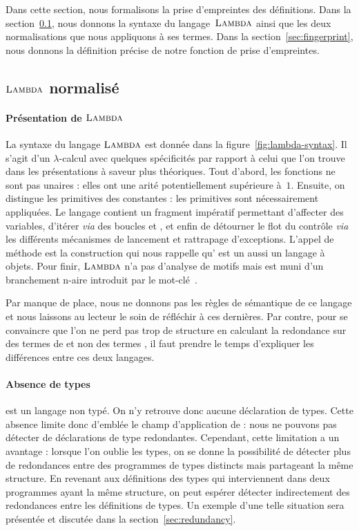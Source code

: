 
Dans cette section, nous formalisons la prise d'empreintes des
définitions. Dans la section~\ref{sec:lambda}, nous donnons la syntaxe
du langage~$\textsc{Lambda}$ ainsi que les deux normalisations que nous
appliquons à ses termes. Dans la section~\ref{sec:fingerprint},
nous donnons la définition précise de notre fonction de prise
d'empreintes.

\subsection{$\textsc{Lambda}$ normalisé}
\label{sec:lambda}

\paragraph{Présentation de $\textsc{Lambda}$}



La syntaxe du langage $\textsc{Lambda}$ est donnée dans la
figure~\ref{fig:lambda-syntax}. Il s'agit d'un $\lambda$-calcul avec
quelques spécificités par rapport à celui que l'on trouve dans les
présentations à saveur plus théoriques. Tout d'abord, les fonctions ne
sont pas unaires : elles ont une arité potentiellement supérieure
à~$1$. Ensuite, on distingue les primitives des constantes : les
primitives sont nécessairement appliquées. Le langage contient un
fragment impératif permettant d'affecter des variables, d'itérer
\textit{via} des boucles  et , et enfin de
détourner le flot du contrôle \textit{via} les différents mécanismes
de lancement et rattrapage d'exceptions. L'appel de méthode est la
construction qui nous rappelle qu'{\OCaml} est un aussi un langage à
objets. Pour finir, $\textsc{Lambda}$ n'a pas d'analyse de motifs mais est
muni d'un branchement n-aire introduit par le mot-clé~.

Par manque de place, nous ne donnons pas les règles de sémantique de
ce langage et nous laissons au lecteur le soin de réfléchir à ces
dernières. Par contre, pour se convaincre que l'on ne perd pas trop de
structure en calculant la redondance sur des termes de {\LambdaCode}
et non des termes {\OCaml}, il faut prendre le temps d'expliquer les
différences entre ces deux langages.

\paragraph{Absence de types}
{\LambdaCode} est un langage non typé. On n'y retrouve donc aucune
déclaration de types. Cette absence limite donc d'emblée le champ
d'application de {\Asak}: nous ne pouvons pas détecter de déclarations
de type redondantes. Cependant, cette limitation a un avantage :
lorsque l'on oublie les types, on se donne la possibilité de détecter
plus de redondances entre des programmes de types distincts mais
partageant la même structure. En revenant aux définitions des types
qui interviennent dans deux programmes ayant la même structure, on
peut espérer détecter indirectement des redondances entre les
définitions de types.
%
Un exemple d'une telle situation sera présentée
et discutée dans la section~\ref{sec:redundancy}.

